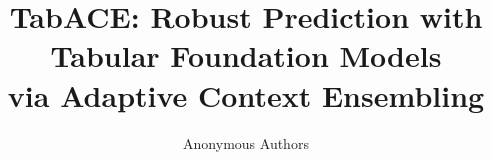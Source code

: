 \documentclass[11pt]{article}
\title{TabACE: Robust Prediction with Tabular Foundation Models\\
via Adaptive Context Ensembling}
\author{Anonymous Authors}
\date{}
\begin{document}
\maketitle

\begin{abstract}

\end{abstract}









\FloatBarrier



\appendix

\end{document}
